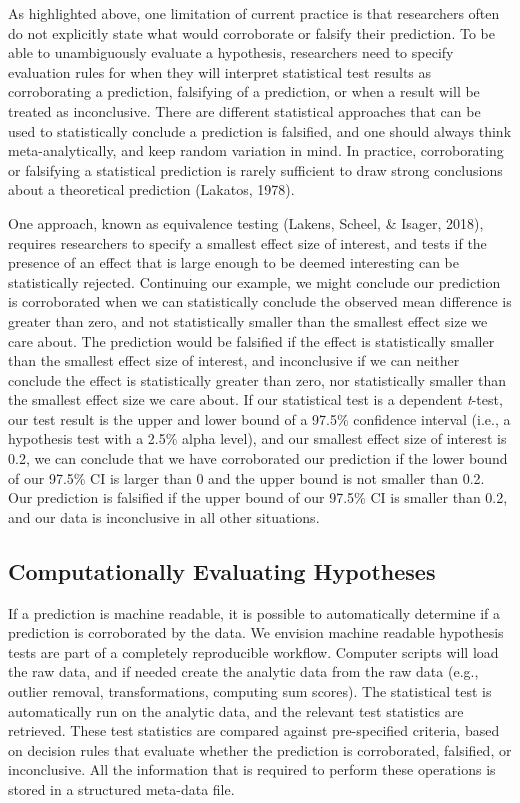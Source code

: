 \documentclass[doc,floatsintext]{apa6}
\begin{document}
As highlighted above, one limitation of current practice is that researchers often do not explicitly state what would corroborate or falsify their prediction. To be able to unambiguously evaluate a hypothesis, researchers need to specify evaluation rules for when they will interpret statistical test results as corroborating a prediction, falsifying of a prediction, or when a result will be treated as inconclusive. There are different statistical approaches that can be used to statistically conclude a prediction is falsified, and one should always think meta-analytically, and keep random variation in mind. In practice, corroborating or falsifying a statistical prediction is rarely sufficient to draw strong conclusions about a theoretical prediction (Lakatos, 1978).

One approach, known as equivalence testing (Lakens, Scheel, \& Isager, 2018), requires researchers to specify a smallest effect size of interest, and tests if the presence of an effect that is large enough to be deemed interesting can be statistically rejected. Continuing our example, we might conclude our prediction is corroborated when we can statistically conclude the observed mean difference is greater than zero, and not statistically smaller than the smallest effect size we care about. The prediction would be falsified if the effect is statistically smaller than the smallest effect size of interest, and inconclusive if we can neither conclude the effect is statistically greater than zero, nor statistically smaller than the smallest effect size we care about. If our statistical test is a dependent \emph{t}-test, our test result is the upper and lower bound of a 97.5\% confidence interval (i.e., a hypothesis test with a 2.5\% alpha level), and our smallest effect size of interest is 0.2, we can conclude that we have corroborated our prediction if the lower bound of our 97.5\% CI is larger than 0 and the upper bound is not smaller than 0.2. Our prediction is falsified if the upper bound of our 97.5\% CI is smaller than 0.2, and our data is inconclusive in all other situations.

\hypertarget{computationally-evaluating-hypotheses}{%
\subsection{Computationally Evaluating Hypotheses}\label{computationally-evaluating-hypotheses}}

If a prediction is machine readable, it is possible to automatically determine if a prediction is corroborated by the data. We envision machine readable hypothesis tests are part of a completely reproducible workflow. Computer scripts will load the raw data, and if needed create the analytic data from the raw data (e.g., outlier removal, transformations, computing sum scores). The statistical test is automatically run on the analytic data, and the relevant test statistics are retrieved. These test statistics are compared against pre-specified criteria, based on decision rules that evaluate whether the prediction is corroborated, falsified, or inconclusive. All the information that is required to perform these operations is stored in a structured meta-data file.
\end{document}
